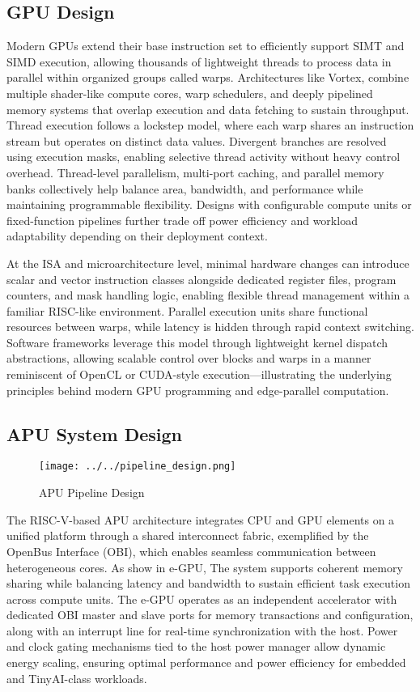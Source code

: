 \documentclass[a4paper,twoside]{article}
\begin{document}
\subsection{GPU Design}

Modern GPUs extend their base instruction set to efficiently support SIMT and SIMD execution, allowing thousands of lightweight threads to process data in parallel within organized groups called warps. Architectures like Vortex, combine multiple shader-like compute cores, warp schedulers, and deeply pipelined memory systems that overlap execution and data fetching to sustain throughput. Thread execution follows a lockstep model, where each warp shares an instruction stream but operates on distinct data values. Divergent branches are resolved using execution masks, enabling selective thread activity without heavy control overhead. Thread-level parallelism, multi-port caching, and parallel memory banks collectively help balance area, bandwidth, and performance while maintaining programmable flexibility. Designs with configurable compute units or fixed-function pipelines further trade off power efficiency and workload adaptability depending on their deployment context.  

At the ISA and microarchitecture level, minimal hardware changes can introduce scalar and vector instruction classes alongside dedicated register files, program counters, and mask handling logic, enabling flexible thread management within a familiar RISC-like environment. Parallel execution units share functional resources between warps, while latency is hidden through rapid context switching. Software frameworks leverage this model through lightweight kernel dispatch abstractions, allowing scalable control over blocks and warps in a manner reminiscent of OpenCL or CUDA-style execution—illustrating the underlying principles behind modern GPU programming and edge-parallel computation.

\subsection{APU System Design}

\begin{figure*}[h]
        \centering
        \texttt{[image: ../../pipeline\_design.png]}
        \caption{APU Pipeline Design}
        \label{fig.example}
\end{figure*}

The RISC-V-based APU architecture integrates CPU and GPU elements on a unified platform through a shared interconnect fabric, exemplified by the OpenBus Interface (OBI), which enables seamless communication between heterogeneous cores. As show in e-GPU, The system supports coherent memory sharing while balancing latency and bandwidth to sustain efficient task execution across compute units. The e-GPU operates as an independent accelerator with dedicated OBI master and slave ports for memory transactions and configuration, along with an interrupt line for real-time synchronization with the host. Power and clock gating mechanisms tied to the host power manager allow dynamic energy scaling, ensuring optimal performance and power efficiency for embedded and TinyAI-class workloads.
\end{document}
